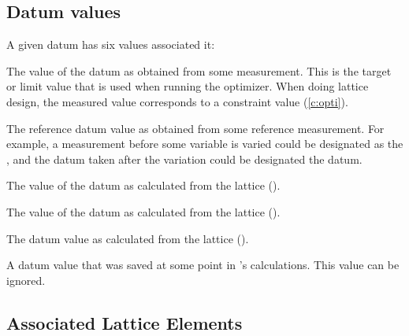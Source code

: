 \subsection{Datum values}
\label{s:datum.values}

A given datum has six values associated it:
\vspace{-2ex}
\begin{description}
  \vspace{-1ex}
  \item[meas] \Newline 
The value of the datum as obtained from some measurement. This is the
target or limit value that is used when running the optimizer. When
doing lattice design, the measured value corresponds to a constraint
value (\ref{c:opti}).
  \vspace{-1ex}
  \item[ref] \Newline
The reference datum value as obtained from some reference measurement. For example,
a measurement before some variable is varied could be designated as
the , and the datum taken after the variation could be 
designated the  datum.
  \vspace{-0.5ex}
  \item[model] \Newline
The value of the datum as calculated from the  lattice ().
  \vspace{-0.5ex}
  \item[design] \Newline
The value of the datum as calculated from the  lattice ().
  \vspace{-0.5ex}
  \item[base] \Newline
The datum value as calculated from the  lattice ().
  \vspace{-0.5ex}
  \item[old] \Newline
A datum value that was saved at some point in \tao's calculations. This value
can be ignored.
\end{description}

\subsection{Associated Lattice Elements}
\label{s:datum.lat.elements}

